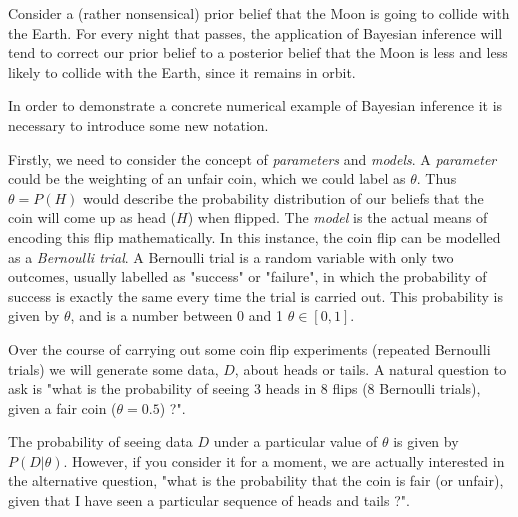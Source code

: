 Consider a (rather nonsensical) prior belief that the Moon is going to collide with the Earth. For every night that passes, the application of Bayesian inference will tend to correct our prior belief to a posterior belief that the Moon is less and less likely to collide with the Earth, since it remains in orbit.

In order to demonstrate a concrete numerical example of Bayesian inference it is necessary to introduce some new notation.

Firstly, we need to consider the concept of \emph{parameters} and \emph{models}. A \emph{parameter} could be the weighting of an unfair coin, which we could label as $\theta$. Thus $\theta = P(H)$ would describe the probability distribution of our beliefs that the coin will come up as head ($H$) when flipped. The \emph{model} is the actual means of encoding this flip mathematically. In this instance, the coin flip can be modelled as a \emph{Bernoulli trial}. A Bernoulli trial is a random variable with only two outcomes, usually labelled as "success" or "failure", in which the probability of success is exactly the same every time the trial is carried out. This probability is given by $\theta$, and is a number between 0 and 1 $\theta\in[0,1]$.

Over the course of carrying out some coin flip experiments (repeated Bernoulli trials) we will generate some data, $D$, about heads or tails. A natural question to ask is "what is the probability of seeing 3 heads in 8 flips (8 Bernoulli trials), given a fair coin ($\theta=0.5$) ?".

The probability of seeing data $D$ under a particular value of $\theta$ is given by $P(D|\theta)$. However, if you consider it for a moment, we are actually interested in the alternative question, "what is the probability that the coin is fair (or unfair), given that I have seen a particular sequence of heads and tails ?".

